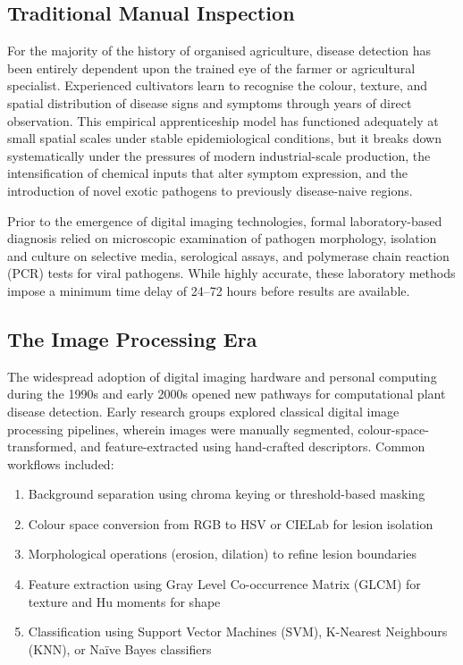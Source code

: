 \documentclass[12pt,a4paper]{report}
\begin{document}
\subsection{Traditional Manual Inspection}

For the majority of the history of organised agriculture, disease detection has been entirely dependent upon the trained eye of the farmer or agricultural specialist. Experienced cultivators learn to recognise the colour, texture, and spatial distribution of disease signs and symptoms through years of direct observation. This empirical apprenticeship model has functioned adequately at small spatial scales under stable epidemiological conditions, but it breaks down systematically under the pressures of modern industrial-scale production, the intensification of chemical inputs that alter symptom expression, and the introduction of novel exotic pathogens to previously disease-naive regions.

Prior to the emergence of digital imaging technologies, formal laboratory-based diagnosis relied on microscopic examination of pathogen morphology, isolation and culture on selective media, serological assays, and polymerase chain reaction (PCR) tests for viral pathogens. While highly accurate, these laboratory methods impose a minimum time delay of 24--72 hours before results are available.

\subsection{The Image Processing Era}

The widespread adoption of digital imaging hardware and personal computing during the 1990s and early 2000s opened new pathways for computational plant disease detection. Early research groups explored classical digital image processing pipelines, wherein images were manually segmented, colour-space-transformed, and feature-extracted using hand-crafted descriptors. Common workflows included:

\begin{enumerate}[label=\alph*., itemsep=4pt]
    \item Background separation using chroma keying or threshold-based masking
    \item Colour space conversion from RGB to HSV or CIELab for lesion isolation
    \item Morphological operations (erosion, dilation) to refine lesion boundaries
    \item Feature extraction using Gray Level Co-occurrence Matrix (GLCM) for texture and Hu moments for shape
    \item Classification using Support Vector Machines (SVM), K-Nearest Neighbours (KNN), or Na\"{i}ve Bayes classifiers
\end{enumerate}
\end{document}
